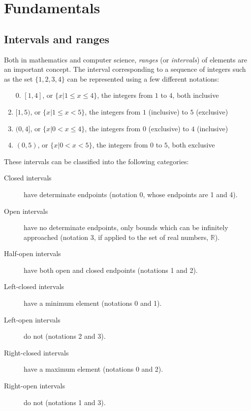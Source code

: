 \section{Fundamentals}

\subsection{Intervals and ranges}
\label{subsec:algo:ranges}

Both in mathematics and computer science, \textit{ranges} (or
\textit{intervals}) of elements are an important concept.  The interval
corresponding to a sequence of integers such as the set $\{1, 2, 3, 4\}$ can be
represented using a few different notations:

\begin{enumerate}
    \item[0.]
        $[1, 4]$, or $\{x | 1 \leq x \leq 4\}$, the integers from $1$ to $4$,
        both inclusive
    \item
        $[1, 5)$, or $\{x | 1 \leq x < 5\}$, the integers from $1$ (inclusive)
        to $5$ (exclusive)
    \item
        $(0, 4]$, or $\{x | 0 < x \leq 4\}$, the integers from $0$ (exclusive)
        to $4$ (inclusive)
    \item
        $(0, 5)$, or $\{x | 0 < x < 5\}$, the integers from $0$ to $5$, both
        exclusive
\end{enumerate}

These intervals can be classified into the following categories:

\begin{description}
    \item[Closed intervals]
        have determinate endpoints (notation 0, whose endpoints are 1 and 4).
    \item[Open intervals]
        have no determinate endpoints, only bounds which can be infinitely
        approached (notation 3, if applied to the set of real numbers,
        $\mathbb{R}$).
    \item[Half-open intervals]
        have both open and closed endpoints (notations 1 and 2).
    \item[Left-closed intervals] have a minimum element (notations 0 and 1).
    \item[Left-open intervals] do not (notations 2 and 3).
    \item[Right-closed intervals] have a maximum element (notations 0 and 2).
    \item[Right-open intervals] do not (notations 1 and 3).
\end{description}

